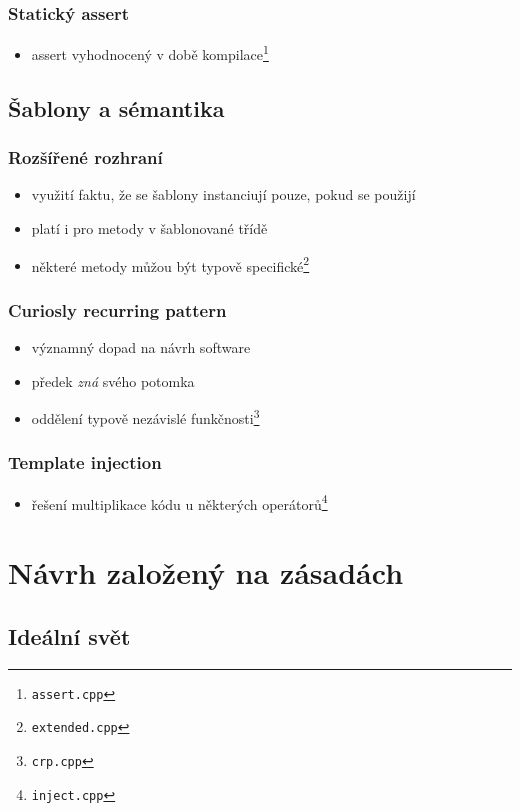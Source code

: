 \begin{frame} \frametitle{Statický assert}
	\begin{itemize}
		\item{assert vyhodnocený v době kompilace\footnote{\texttt{assert.cpp}}}
	\end{itemize}
\end{frame}

\subsection{Šablony a sémantika}

\begin{frame} \frametitle{Rozšířené rozhraní}
	\begin{itemize}
		\item{využití faktu, že se šablony instanciují pouze, pokud se použijí}
		\item{platí i pro metody v šablonované třídě}
		\item{některé metody můžou být typově specifické\footnote{\texttt{extended.cpp}}}
	\end{itemize}
\end{frame}


\begin{frame} \frametitle{Curiosly recurring pattern}
	\begin{itemize}
		\item{významný dopad na návrh software}
		\item{předek \textit{zná} svého potomka}
		\item{oddělení typově nezávislé funkčnosti\footnote{\texttt{crp.cpp}}}
	\end{itemize}
\end{frame}

\begin{frame} \frametitle{Template injection}
	\begin{itemize}
		\item{řešení multiplikace kódu u některých operátorů\footnote{\texttt{inject.cpp}}}
	\end{itemize}
\end{frame}

\section{Návrh založený na zásadách}
\subsection{Ideální svět}

